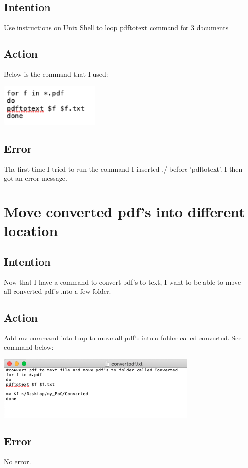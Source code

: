 \documentclass{article}
\begin{document}
\subsection{Intention}
Use instructions on Unix Shell to loop pdftotext command for 3 documents
\subsection{Action}
Below is the command that I used:

\includegraphics[width=5cm]{pdftotextloop.png}

\subsection{Error}
The first time I tried to run the command I inserted ./ before 'pdftotext'. I then got an error message. 

\section{Move converted pdf's into different location}
\subsection{Intention}
Now that I have a command to convert pdf's to text, I want to be able to move all converted pdf's into a few folder. 

\subsection{Action}
Add mv command into loop to move all pdf's into a folder called converted. See command below:

\includegraphics[width=10cm]{converted.png}

\subsection{Error}
No error. 
\end{document}
